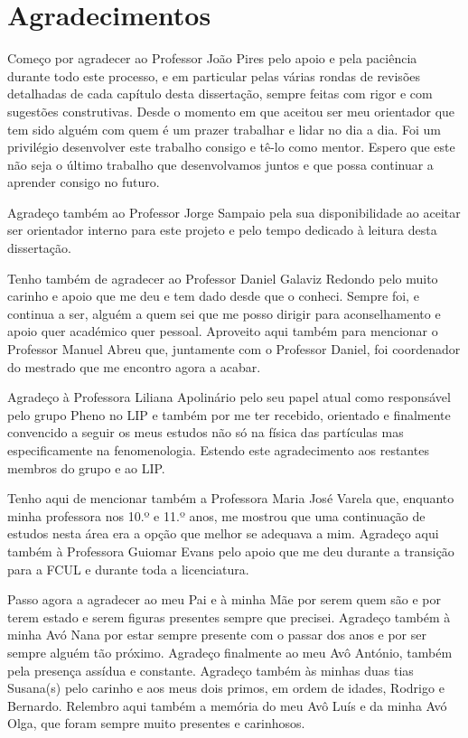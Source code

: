 \chapter*{Agradecimentos}


Começo por agradecer ao Professor João Pires pelo apoio e pela paciência durante todo este 
processo, e em particular pelas várias rondas de revisões detalhadas de cada capítulo desta dissertação, 
sempre feitas com rigor e com sugestões construtivas. Desde o momento em que aceitou ser meu orientador que tem sido alguém com 
quem é um prazer trabalhar e lidar no dia a dia. Foi um privilégio desenvolver este trabalho 
consigo e tê-lo como mentor. Espero que este não seja o último trabalho que desenvolvamos 
juntos e que possa continuar a aprender consigo no futuro.

Agradeço também ao Professor Jorge Sampaio pela sua disponibilidade ao aceitar ser orientador 
interno para este projeto e pelo tempo dedicado à leitura desta dissertação.

Tenho também de agradecer ao Professor Daniel Galaviz Redondo pelo muito carinho e apoio 
que me deu e tem dado desde que o conheci. Sempre foi, e continua a ser, alguém a quem sei que 
me posso dirigir para aconselhamento e apoio quer académico quer pessoal. Aproveito 
aqui também para mencionar o Professor Manuel Abreu que, juntamente com o Professor Daniel, foi coordenador do mestrado que me encontro agora a acabar. 

Agradeço à Professora Liliana Apolinário pelo seu papel atual como responsável pelo grupo 
Pheno no LIP e também por me ter recebido, orientado e finalmente convencido a seguir os 
meus estudos não só na física das partículas mas especificamente na fenomenologia. Estendo 
este agradecimento aos restantes membros do grupo e ao LIP. 

Tenho aqui de mencionar também a Professora Maria José Varela que, enquanto minha professora 
nos 10.º e 11.º anos, me mostrou que uma continuação de estudos nesta área era a opção que melhor se adequava a mim. Agradeço aqui também à Professora Guiomar Evans pelo apoio 
que me deu durante a transição para a FCUL e durante toda a licenciatura. 

Passo agora a agradecer ao meu Pai e à minha Mãe por serem quem são e por terem estado e serem figuras 
presentes sempre que precisei. Agradeço também à minha Avó Nana por estar sempre presente com o 
passar dos anos e por ser sempre alguém tão próximo. Agradeço finalmente ao meu Avô António, 
também pela presença assídua e constante. 
Agradeço também às minhas duas tias Susana(s) pelo carinho e aos meus dois primos, 
em ordem de idades, Rodrigo e Bernardo. Relembro aqui também a memória do meu Avô Luís e da 
minha Avó Olga, que foram sempre muito presentes e carinhosos.

